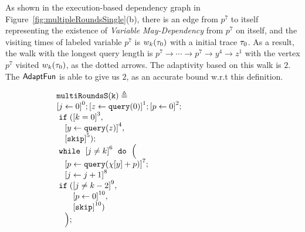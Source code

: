\begin{example}
    As shown in the execution-based dependency graph in Figure~\ref{fig:multipleRoundsSingle}(b), 
    there is an edge from $p^7$ to itself representing the existence of \emph{Variable May-Dependency} from $p^7$ on itself,
    and the visiting times of labeled variable $p^7$ is 
    $w_k(\mathtt{\tau}_0)$ with a initial trace $\mathtt{\tau}_0$. 
    As a result, the walk with the longest query length 
    is
    $p^7  \to \cdots \to p^7 \to y^4  \to z^1 $ with the vertex $p^7$ visited $w_k(\mathtt{\tau}_0)$,
    as the dotted arrows. 
    The adaptivity 
    based on
    this walk
    is $2$.
    The $\textsf{AdaptFun}$ is able to give us $2$,  as an accurate bound w.r.t this definition.
        \begin{figure}
     \centering
    \quad
    \begin{subfigure}{.35\textwidth}
        \begin{centering}
    {\small
        $ \begin{array}{l}
                \kw{multiRoundsS(k)} \triangleq \\
                   \clabel{ \assign{j}{0}}^{0} ; 
                    \clabel{\assign{z}{\query(0)} }^{1} ;             
                    \clabel{\assign{p}{0} }^{2} ; \\
                    \eif(\clabel{ k = 0}^{3}, \\
                     \quad \clabel{ \assign{y}{\query(z)}}^{4}, \\
                     \quad \clabel{\eskip}^5);\\
                    \ewhile ~ \clabel{j \neq k}^{6} ~ \edo ~ \Big(
                     \\
                     \quad \clabel{\assign{p}{\query(\chi[y]+p)} }^{7}  ; \\
                     \quad \clabel{\assign{j}{j + 1}}^{8}\\
                     \eif(\clabel{ j \neq k - 2}^{9}, \\
                     \quad \quad \clabel{ \assign{p}{0}}^{10} ,\\ 
                     \quad \quad \clabel{\eskip}^{10})\\
                     \quad \Big);\\
                \end{array}
        $       
    }
        \caption{}

\end{centering}
\end{subfigure}
\end{figure}
\end{example}
